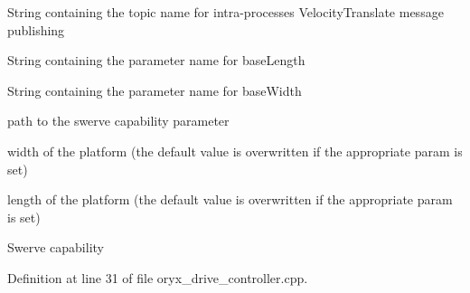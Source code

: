 \-String containing the topic name for intra-\/processes \-Velocity\-Translate message publishing

\-String containing the parameter name for base\-Length

\-String containing the parameter name for base\-Width

path to the swerve capability parameter

width of the platform (the default value is overwritten if the appropriate param is set)

length of the platform (the default value is overwritten if the appropriate param is set)

\-Swerve capability 

\-Definition at line 31 of file oryx\-\_\-drive\-\_\-controller.\-cpp.


